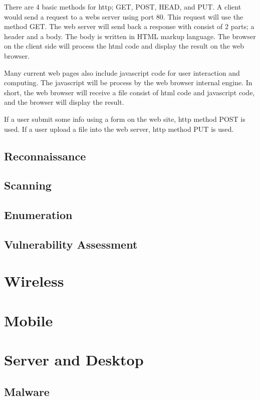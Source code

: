 \documentclass[7x9]{times}
\begin{document}
There are 4 basic methods for http; GET, POST, HEAD, and PUT\@. A client would 
send a request to a webs server using port 80. This request will use the method
GET\@. The web server will send back a response with consist of 2 parts; a header
and a body. The body is written in HTML markup language. The browser on the
client side will process the html code and display the result on the web
browser.

Many current web pages also include javascript code for user interaction and 
computing. The javascript will be process by the web browser internal engine.
In short, the web browser will receive a file consist of html code and javascript
code, and the browser will display the result.

If a user submit some info using a form on the web site, http method POST is 
used. If a user upload a file into the web server, http method PUT is used.





\section{Reconnaissance}
\section{Scanning}
\section{Enumeration}
\section{Vulnerability Assessment}

\chapter{Wireless}



\chapter{Mobile}

\chapter{Server and Desktop}


\section{Malware}
\end{document}
